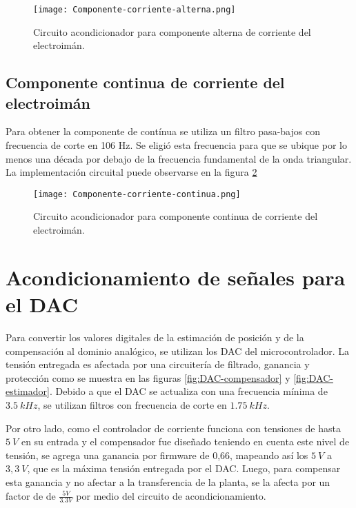 \begin{figure}[H]
	\centering
	\texttt{[image: Componente-corriente-alterna.png]}
	\caption{ Circuito acondicionador para componente alterna de corriente del electroimán.
	}
	\label{fig:componente-corriente-alterna}
\end{figure}

\subsection{Componente  continua de corriente del electroimán}

\noindent Para obtener la componente de contínua se utiliza un filtro pasa-bajos con frecuencia de corte en 106 Hz. Se eligió esta frecuencia para que se ubique por lo menos una década por debajo de la frecuencia fundamental de la onda triangular. La implementación circuital puede observarse en la figura \ref{fig:componente-corriente-continua}


\begin{figure}[H]
	\centering
	\texttt{[image: Componente-corriente-continua.png]}
	\caption{Circuito acondicionador para componente continua de corriente del electroimán.
	}
	\label{fig:componente-corriente-continua}
\end{figure}

\section{Acondicionamiento de señales para el DAC}

\noindent Para convertir los valores digitales de la estimación de posición y de la compensación al dominio analógico, se utilizan los DAC del microcontrolador. La tensión entregada es afectada por una circuitería de filtrado, ganancia y protección como se muestra en las figuras \ref{fig:DAC-compensador} y \ref{fig:DAC-estimador}. Debido a que el DAC se actualiza con una frecuencia mínima de $3.5\:kHz$, se utilizan filtros con frecuencia de corte en $1.75\:kHz$.

\noindent Por otro lado, como el controlador de corriente funciona con tensiones de hasta $5\:V$ en su entrada y el compensador fue diseñado teniendo en cuenta este nivel de tensión, se agrega una ganancia por firmware de 0,66, mapeando así los $5\:V$ a $3,3\:V$, que es la máxima tensión entregada por el DAC. Luego, para compensar esta ganancia y no afectar a la transferencia de la planta, se la afecta por un factor de de $\frac{5V}{3.3V}$ por medio del circuito de acondicionamiento.

